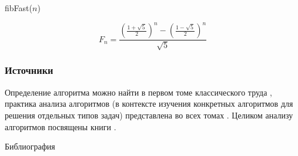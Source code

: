 \begin{frame}
    \begin{algorithm}[H]
        \caption{fibFast($n$)}
        \begin{algorithmic}[1]
            
            \ENDIF
                  
            \ELSE
                 
                
                  
                  
                 
            \ENDIF
        \end{algorithmic}
    \end{algorithm}
\end{frame}

\begin{frame}
    \begin{center}
    \end{center}
    \[
        F_n = 
        \frac{
            \left(\frac{1+\sqrt{5}}{2}\right)^n - \left(\frac{1-\sqrt{5}}{2}\right)^n
        }{
            \sqrt{5}
        }
    \]
\end{frame}


\appendix


\begin{frame}
    \frametitle{Источники}
    
    Определение алгоритма можно найти в первом томе классического труда \cite{bib:knuth:artOfProgramming1}, практика анализа алгоритмов (в контексте изучения конкретных алгоритмов для решения отдельных типов задач) представлена во всех томах \cite{bib:knuth:artOfProgramming1, bib:knuth:artOfProgramming2, bib:knuth:artOfProgramming3}. Целиком анализу алгоритмов посвящены книги \cite{bib:mcconnel:alghorithmAnalysis, bib:miller:secParAlghorithm}.
\end{frame}


\begin{frame}[allowframebreaks]{Библиография}
    
    
\end{frame}

